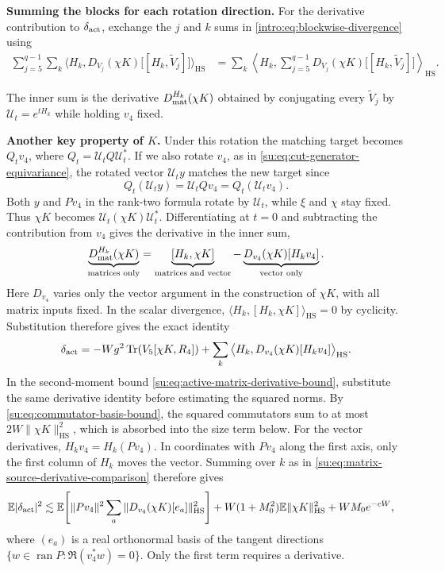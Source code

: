 \documentclass[11pt]{article}
\numberwithin{equation}{section}
\theoremstyle{remark}
\newcommand{\E}{\mathbb E}
\newcommand{\Tr}{\operatorname{Tr}}
\newcommand{\ran}{\operatorname{ran}}
\newcommand{\HS}{\mathrm{HS}}
\begin{document}
\textbf{Summing the blocks for each rotation direction.}
For the derivative contribution to $\delta_{\rm act}$, exchange the
$j$ and $k$ sums in \eqref{intro:eq:blockwise-divergence} using
\[
 \begin{aligned}
  \sum_{j=5}^{q-1}\sum_k\big\langle H_k,
        D_{V_j}(\chi K)\bigl[[H_k,\widetilde V_j]\bigr]\big\rangle_{\HS}
  &=\sum_k\left\langle H_k,
        \sum_{j=5}^{q-1}D_{V_j}(\chi K)\bigl[[H_k,\widetilde V_j]\bigr]
                          \right\rangle_{\HS}.
 \end{aligned}
\]

The inner sum is the derivative $D_{\rm mat}^{H_k}(\chi K)$ obtained
by conjugating every $\widetilde V_j$ by $\mathcal U_t=e^{tH_k}$
while holding $v_4$ fixed.
 
\textbf{Another key property of $K$.}
Under this rotation the matching target becomes $Q_t v_4$, where
$Q_t=\mathcal U_t Q\mathcal U_t^*$. If we also rotate $v_4$, as in
\eqref{su:eq:cut-generator-equivariance}, the rotated vector $\mathcal U_t y$ matches the new target since
\[
 Q_t(\mathcal U_t y)=\mathcal U_t Qv_4=Q_t(\mathcal U_t v_4).
\]
Both $y$ and $Pv_4$ in the rank-two formula rotate by $\mathcal U_t$,
while $\xi$ and $\chi$ stay fixed. Thus $\chi K$ becomes
$\mathcal U_t(\chi K)\mathcal U_t^*$. Differentiating at $t=0$ and
subtracting the contribution from $v_4$ gives the derivative in the inner sum,
\[
 \underbrace{D_{\rm mat}^{H_k}(\chi K)}_{\text{matrices only}}
 =\underbrace{[H_k,\chi K]}_{\text{matrices and vector}}
  -\underbrace{D_{v_4}(\chi K)[H_kv_4]}_{\text{vector only}}.
\]
Here $D_{v_4}$ varies only the vector argument in the construction of
$\chi K$, with all matrix inputs fixed.
In the scalar divergence, $\langle H_k,[H_k,\chi K]\rangle_{\HS}=0$
by cyclicity. Substitution therefore gives the exact identity
\[
 \delta_{\rm act}
 =-Wg^2\Tr(V_5[\chi K,R_4])
   +\sum_k\big\langle H_k,D_{v_4}(\chi K)[H_kv_4]\big\rangle_{\HS}.
\]
In the second-moment bound \eqref{su:eq:active-matrix-derivative-bound},
substitute the same derivative identity before estimating the squared norms.
By \eqref{su:eq:commutator-basis-bound}, the squared commutators sum to
at most $2W\|\chi K\|_{\HS}^2$, which is absorbed into the size term below.
For the vector derivatives, $H_kv_4=H_k(Pv_4)$. In coordinates with
$Pv_4$ along the first axis, only the first column of $H_k$ moves the
vector. Summing over $k$ as in \eqref{su:eq:matrix-source-derivative-comparison}
therefore gives
\[
 \begin{aligned}
 \E|\delta_{\rm act}|^2
 &\lesssim \E\!\left[\|Pv_4\|^2\sum_a
       \|D_{v_4}(\chi K)[e_a]\|_{\HS}^2\right] +W(1+M_0^2)\E\|\chi K\|_{\HS}^2+WM_0e^{-cW},
 \end{aligned}
\]
where $(e_a)$ is a real orthonormal basis of the tangent directions
$\{w\in\ran P:\Re(v_4^*w)=0\}$. Only the first term requires a derivative.
\end{document}
